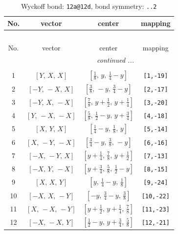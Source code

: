\documentclass[fleqn,8pt]{jsarticle}
\begin{document}
\begin{longtable}{cccc}
\caption{Wyckoff bond: {\tt 12a@12d}, bond symmetry: {\tt ..2}}
 \\
 \hline \hline
No. & vector & center & mapping \\ \hline \endfirsthead

\multicolumn{3}{l}{\tablename\ \thetable{}} \\
 \hline \hline
No. & vector & center & mapping \\ \hline \endhead

 \hline \hline
\multicolumn{3}{r}{\footnotesize\it continued ...} \\ \endfoot

 \hline \hline
\multicolumn{3}{r}{} \\ \endlastfoot

1 & $\left[ Y,\, X,\, X \right]$ & $\left[ \frac{1}{8},\, y,\, \frac{1}{4} - y \right]$ & {\tt [1,-19]} \\ \hline
2 & $\left[ - Y,\, - X,\, X \right]$ & $\left[ \frac{3}{8},\, - y,\, \frac{3}{4} - y \right]$ & {\tt [2,-17]} \\ \hline
3 & $\left[ - Y,\, X,\, - X \right]$ & $\left[ \frac{7}{8},\, y + \frac{1}{2},\, y + \frac{1}{4} \right]$ & {\tt [3,-20]} \\ \hline
4 & $\left[ Y,\, - X,\, - X \right]$ & $\left[ \frac{5}{8},\, \frac{1}{2} - y,\, y + \frac{3}{4} \right]$ & {\tt [4,-18]} \\ \hline
5 & $\left[ X,\, Y,\, X \right]$ & $\left[ \frac{1}{4} - y,\, \frac{1}{8},\, y \right]$ & {\tt [5,-14]} \\ \hline
6 & $\left[ X,\, - Y,\, - X \right]$ & $\left[ \frac{3}{4} - y,\, \frac{3}{8},\, - y \right]$ & {\tt [6,-16]} \\ \hline
7 & $\left[ - X,\, - Y,\, X \right]$ & $\left[ y + \frac{1}{4},\, \frac{7}{8},\, y + \frac{1}{2} \right]$ & {\tt [7,-13]} \\ \hline
8 & $\left[ - X,\, Y,\, - X \right]$ & $\left[ y + \frac{3}{4},\, \frac{5}{8},\, \frac{1}{2} - y \right]$ & {\tt [8,-15]} \\ \hline
9 & $\left[ X,\, X,\, Y \right]$ & $\left[ y,\, \frac{1}{4} - y,\, \frac{1}{8} \right]$ & {\tt [9,-24]} \\ \hline
10 & $\left[ - X,\, X,\, - Y \right]$ & $\left[ - y,\, \frac{3}{4} - y,\, \frac{3}{8} \right]$ & {\tt [10,-22]} \\ \hline
11 & $\left[ X,\, - X,\, - Y \right]$ & $\left[ y + \frac{1}{2},\, y + \frac{1}{4},\, \frac{7}{8} \right]$ & {\tt [11,-23]} \\ \hline
12 & $\left[ - X,\, - X,\, Y \right]$ & $\left[ \frac{1}{2} - y,\, y + \frac{3}{4},\, \frac{5}{8} \right]$ & {\tt [12,-21]} \\
\end{longtable}
\end{document}
